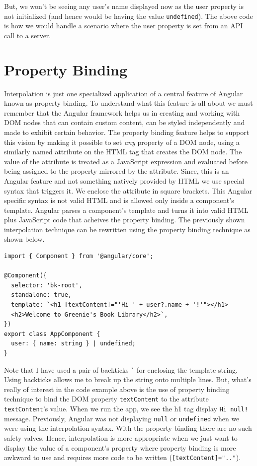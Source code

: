 \documentclass{report}
\begin{document}
But, we won't be seeing any user's name displayed now as the user property is not initialized (and hence would be having the value \verb|undefined|). The above code is how we would handle a scenario where the user property is set from an API call to a server.

\section{Property Binding}
Interpolation is just one specialized application of a central feature of Angular known as property binding. To understand what this feature is all about we must remember that the Angular framework helps us in creating and working with DOM nodes that can contain custom content, can be styled independently and made to exhibit certain behavior. The property binding feature helps to support this vision by making it possible to set \emph{any} property of a DOM node, using a similarly named attribute on the HTML tag that creates the DOM node. The value of the attribute is treated as a JavaScript expression and evaluated before being assigned to the property mirrored by the attribute. Since, this is an Angular feature and not something natively provided by HTML we use special syntax that triggers it. We enclose the attribute in square brackets. This Angular specific syntax is not valid HTML and is allowed only inside a component's template. Angular parses a component's template and turns it into valid HTML plus JavaScript code that acheives the property binding. The previously shown interpolation technique can be rewritten using the property binding technique as shown below.

\begin{Verbatim}[label=v2.1.3]
import { Component } from '@angular/core';

@Component({
  selector: 'bk-root',
  standalone: true,
  template: `<h1 [textContent]="'Hi ' + user?.name + '!'"></h1>
  <h2>Welcome to Greenie's Book Library</h2>`,
})
export class AppComponent {
  user: { name: string } | undefined;
}
\end{Verbatim}

Note that I have used a pair of backticks \verb|`| for enclosing the template string. Using backticks allows me to break up the string onto multiple lines. But, what's really of interest in the code example above is the use of property binding technique to bind the DOM property \verb|textContent| to the attribute \verb|textContent|'s value. When we run the app, we see the h1 tag display \texttt{Hi null!} message. Previously, Angular was not displaying \verb|null| or \verb|undefined| when we were using the interpolation syntax. With the property binding there are no such safety valves. Hence, interpolation is more appropriate when we just want to display the value of a component's property where property binding is more awkward to use and requires more code to be written (\verb|[textContent]=".."|).
\end{document}
